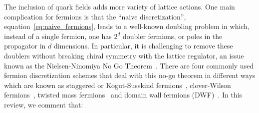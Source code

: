 The inclusion of quark fields adds more variety of lattice actions.
One main complication for fermions is that the ``naive discretization'', equation~\eqref{eq:naive_fermions}, leads to a well-known doubling problem in which, instead of a single fermion, one has $2^d$ doubler fermions, or poles in the propagator in $d$ dimensions.
In particular, it is challenging to remove these doublers without breaking chiral symmetry with the lattice regulator, an issue known as the Nielsen-Ninomiya No Go Theorem~\cite{Nielsen:1981hk,Nielsen:1980rz,Nielsen:1981xu}.
There are four commonly used fermion discretization schemes that deal with this no-go theorem in different ways which are known as staggered or Kogut-Susskind fermions~\addcite{}, clover-Wilson fermions~\addcite{}, twisted mass fermions~\addcite{} and domain wall fermions (DWF)~\addcite{}.
In this review, we comment that:
